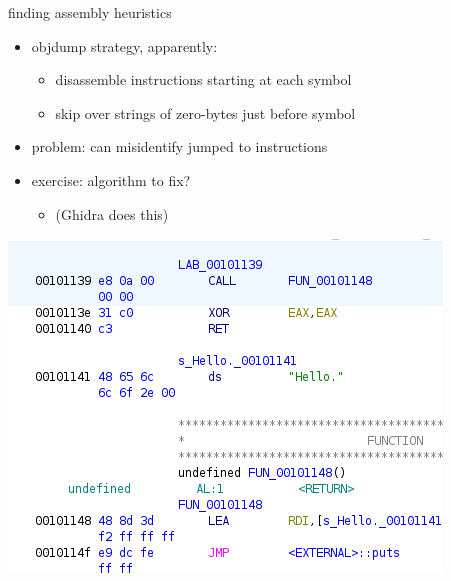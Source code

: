 \begin{frame}{finding assembly heuristics}
    \begin{itemize}
    \item objdump strategy, apparently:
        \begin{itemize}
        \item disassemble instructions starting at each symbol
        \item skip over strings of zero-bytes just before symbol
        \end{itemize}
    \item problem: can misidentify jumped to instructions
    \item exercise: algorithm to fix?
        \begin{itemize}
        \item (Ghidra does this)
        \end{itemize}
    \end{itemize}
\end{frame}



\begin{frame}
\includegraphics[width=\textwidth]{ghidra-disass-mixed-detail}
\end{frame}
